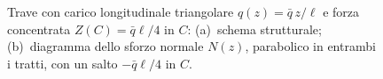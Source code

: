 \begin{figure}[htbp]
			\caption{Trave con carico longitudinale triangolare
				$q(z) = \bar{q}\,z/\ell$ e forza concentrata
				$Z(C) = \bar{q}\ell/4$ in $C$:
				(a)~schema strutturale;
				(b)~diagramma dello sforzo normale $N(z)$, parabolico in
				entrambi i tratti, con un salto $-\bar{q}\ell/4$ in $C$.}
			\label{fig:stat_long_iso_02}
		\end{figure}
